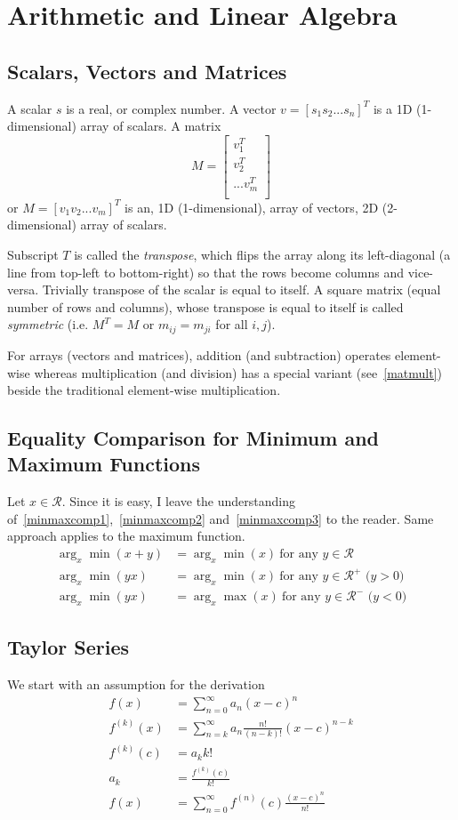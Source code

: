 \documentclass{book}
\numberwithin{equation}{subsection}
\begin{document}
\chapter{Arithmetic and Linear Algebra}
\section{Scalars, Vectors and Matrices}
\label{defn_svm}
A scalar $s$ is a real, or complex number. A vector $v = [s_1 s_2 ... s_n]^T$ is a 1D (1-dimensional) array of scalars.
A matrix
$$
M = \begin{bmatrix}
    v_1^T\\
    v_2^T\\
    ...
    v_m^T\\
\end{bmatrix}
$$
or $M = [v_1 v_2 ... v_m]^T$
is an, 1D (1-dimensional), array of vectors, 2D (2-dimensional) array of scalars.

Subscript $T$ is called the \textit{transpose}, which flips the array along its left-diagonal (a line from top-left to bottom-right) so that the rows become columns and vice-versa. Trivially transpose of the scalar is equal to itself. A square matrix (equal number of rows and columns), whose transpose is equal to itself is called \textit{symmetric} (i.e. $M^T=M$ or $m_{ij} = m_{ji}$ for all $i, j$).

For arrays (vectors and matrices), addition (and subtraction) operates element-wise whereas multiplication (and division) has a special variant (see~\ref{matmult}) beside the traditional element-wise multiplication.
\section{Equality Comparison for Minimum and Maximum Functions}
Let $x \in \mathcal{R}$. Since it is easy, I leave the understanding of~\ref{minmaxcomp1},~\ref{minmaxcomp2} and~\ref{minmaxcomp3} to the reader. Same approach applies to the maximum function.
\begin{align}
    \arg_x\min(x+y) &= \arg_x\min(x)\ \text{for any $y \in \mathcal{R}$}\label{minmaxcomp1}\\
     \arg_x\min(yx) &= \arg_x\min(x)\ \text{for any $y \in \mathcal{R^+}$ ($y>0$)}\label{minmaxcomp2}\\
     \arg_x\min(yx) &= \arg_x\max(x)\ \text{for any $y \in \mathcal{R^-}$ ($y<0$)}\label{minmaxcomp3}
\end{align}
\section{Taylor Series}
We start with an assumption for the derivation
\begin{align}
    f(x) &= \sum_{n=0}^\infty a_n (x-c)^n\\
    f^{(k)}(x) &= \sum_{n=k}^\infty a_n \frac{n!}{(n-k)!}(x-c)^{n-k}\\
    f^{(k)}(c) &= a_k k!\\
    a_k &= \frac{f^{(k)}(c)}{k!}\\
    f(x) &= \sum_{n=0}^\infty f^{(n)}(c)\frac{(x-c)^n}{n!}\\
\end{align}
\end{document}
